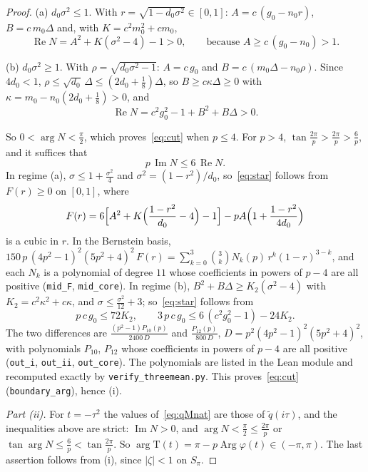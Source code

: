 \documentclass[10pt,a4paper]{article}
\theoremstyle{plain}
\theoremstyle{remark}
\numberwithin{equation}{section}
\newcommand{\Tm}{\mathrm{T}}
\DeclareMathOperator{\re}{Re}\DeclareMathOperator{\im}{Im}
\DeclareMathOperator{\Arg}{Arg}\DeclareMathOperator{\Log}{Log}
\newcommand{\lean}[1]{\texttt{#1}}
\begin{document}
\begin{proof}
(a) $d_0\sigma^{2}\le1$. With $r=\sqrt{1-d_0\sigma^{2}}\in[0,1]$: $A=c\,(g_0-n_0r)$,
$B=c\,m_0\Delta$ and, with $K=c^{2}m_0^{2}+cm_0$,
\[ \re N=A^{2}+K(\sigma^{2}-4)-1>0,\qquad\text{because }A\ge c\,(g_0-n_0)>1 . \]

(b) $d_0\sigma^{2}\ge1$. With $\rho=\sqrt{d_0\sigma^{2}-1}$: $A=c\,g_0$ and
$B=c\,(m_0\Delta-n_0\rho)$. Since $4d_0<1$, $\rho\le\sqrt{d_0}\,\Delta\le(2d_0+\frac18)\Delta$, so
$B\ge c\kappa\Delta\ge0$ with $\kappa=m_0-n_0(2d_0+\frac18)>0$, and
\[ \re N=c^{2}g_0^{2}-1+B^{2}+B\Delta>0 . \]

So $0<\arg N<\frac\pi2$, which proves~\eqref{eq:cut} when $p\le4$. For $p>4$,
$\tan\frac{2\pi}p>\frac{2\pi}p>\frac6p$, and it suffices that
\begin{equation}\label{eq:star}
 p\,\im N\le6\,\re N .
\end{equation}
In regime (a), $\sigma\le1+\frac{\sigma^{2}}4$ and $\sigma^{2}=(1-r^{2})/d_0$, so~\eqref{eq:star}
follows from $F(r)\ge0$ on $[0,1]$, where
\[
 F(r)=6\Bigl[A^{2}+K\Bigl(\frac{1-r^{2}}{d_0}-4\Bigr)-1\Bigr]-pA\Bigl(1+\frac{1-r^{2}}{4d_0}\Bigr)
\]
is a cubic in $r$. In the Bernstein basis,
$150\,p\,(4p^{2}-1)^{2}(5p^{2}+4)^{2}\,F(r)=\sum_{k=0}^{3}\binom3kN_k(p)\,r^{k}(1-r)^{3-k}$, and each
$N_k$ is a polynomial of degree $11$ whose coefficients in powers of $p-4$ are all positive
(\lean{mid\_F}, \lean{mid\_core}). In regime (b), $B^{2}+B\Delta\ge K_2(\sigma^{2}-4)$ with
$K_2=c^{2}\kappa^{2}+c\kappa$, and $\sigma\le\frac{\sigma^{2}}{12}+3$; so~\eqref{eq:star} follows from
\[
 p\,c\,g_0\le72K_2,\qquad 3\,p\,c\,g_0\le6\,(c^{2}g_0^{2}-1)-24K_2 .
\]
The two differences are $\frac{(p^{2}-1)P_{10}(p)}{2400\,D}$ and $\frac{P_{12}(p)}{800\,D}$,
$D=p^{2}(4p^{2}-1)^{2}(5p^{2}+4)^{2}$, with polynomials $P_{10}$, $P_{12}$ whose coefficients in
powers of $p-4$ are all positive (\lean{out\_i}, \lean{out\_ii}, \lean{out\_core}). The polynomials
are listed in the Lean module and recomputed exactly by \texttt{verify\_threemean.py}. This
proves~\eqref{eq:cut} (\lean{boundary\_arg}), hence (i).

\emph{Part (ii).} For $t=-\tau^{2}$ the values of~\eqref{eq:qMnat} are those of $\tilde q(i\tau)$,
and the inequalities above are strict: $\im N>0$, and $\arg N<\frac\pi2\le\frac{2\pi}p$ or
$\tan\arg N\le\frac6p<\tan\frac{2\pi}p$. So $\arg\Tm(t)=\pi-p\Arg\varphi(t)\in(-\pi,\pi)$. The last
assertion follows from (i), since $|\zeta|<1$ on $S_\pi$.
\end{proof}
\end{document}
